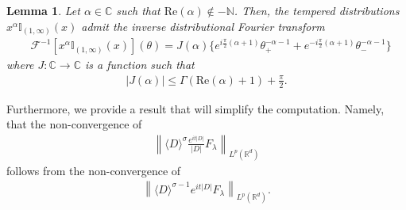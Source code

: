 \documentclass[a4paper, reqno, 11pt]{amsart}
\newtheorem{corollary}[theorem]{Corollary}
\newtheorem{lemma}[theorem]{Lemma}
\theoremstyle{definition}
\begin{document}
	\begin{lemma}\label{lemma:invft-xalpha-nu}
	Let $\alpha \in \mathbb{C}$ such that $\text{Re}(\alpha) \notin -\mathbb{N}$. Then, the tempered distributions $x^{\alpha} \mathbb{I}_{(1,\infty)}(x)$ admit the inverse distributional Fourier transform
	\begin{align*}
	&\mathcal{F}^{-1}[x^{\alpha} \mathbb{I}_{(1,\infty)}(x)](\theta)= J(\alpha) \{ e^{i\frac{\pi}{2}(\alpha+1)} \theta_+^{-\alpha-1} + e^{-i\frac{\pi}{2}(\alpha+1)} \theta_-^{-\alpha-1} \}
	\end{align*}
	where $J : \mathbb{C} \rightarrow \mathbb{C}$ is a function such that
	\begin{align*}
	|J(\alpha)| \leq \Gamma(\text{Re}(\alpha)+1) + \frac{\pi}{2}.
	\end{align*}
	\end{lemma}

Furthermore, we provide a result that will simplify the computation. Namely, that the non-convergence of 
\begin{align*}
\left\|\langle D \rangle^{\sigma} \frac{e^{it|D|}}{|D|} F_{\lambda} \right\|_{L^p(\mathbb{R}^d)}
\end{align*} 
follows from the non-convergence of 
\begin{align*}
\left\|\langle D \rangle^{\sigma-1} e^{it|D|} F_{\lambda} \right\|_{L^p(\mathbb{R}^d)}.
\end{align*}
\end{document}
